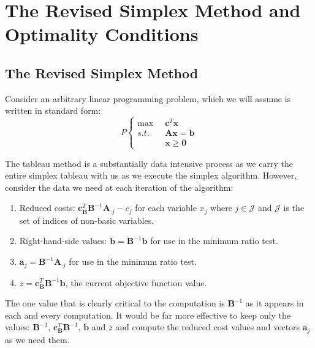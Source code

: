 \chapter{The Revised Simplex Method and Optimality Conditions}\label{chap:KKT}
\section{The Revised Simplex Method}
Consider an arbitrary linear programming problem, which we will assume is written in standard form:
\begin{equation}
P\left\{
\begin{aligned}
\max\;\; & \mathbf{c}^T\mathbf{x}\\
s.t.\;\; & \mathbf{A}\mathbf{x} = \mathbf{b}\\
& \mathbf{x} \geq \mathbf{0}
\end{aligned}\right.
\end{equation}

The tableau method is a substantially data intensive process as we carry the entire simplex tableau with us as we execute the simplex algorithm. However, consider the data we need at each iteration of the algorithm:
\begin{enumerate}
\item Reduced costs: $\mathbf{c}_\mathbf{B}^T\mathbf{B}^{-1}\mathbf{A}_{\cdot j} - c_j$ for each variable $x_j$ where $j \in \mathcal{J}$ and $\mathcal{J}$ is the set of indices of non-basic variables.

\item Right-hand-side values: $\overline{\mathbf{b}} = \mathbf{B}^{-1}\mathbf{b}$ for use in the minimum ratio test.

\item $\overline{\mathbf{a}}_j = \mathbf{B}^{-1}\mathbf{A}_{\cdot j}$ for use in the minimum ratio test.

\item $\overline{z} = \mathbf{c}_{\mathbf{B}}^T\mathbf{B}^{-1}\mathbf{b}$, the current objective function value. 
\end{enumerate}

The one value that is clearly critical to the computation is $\mathbf{B}^{-1}$ as it appears in each and every computation. It would be far more effective to keep only the values: $\mathbf{B}^{-1}$, $\mathbf{c}_{\mathbf{B}}^T\mathbf{B}^{-1}$, $\overline{\mathbf{b}}$ and $\overline{z}$ and compute the reduced cost values and vectors $\overline{\mathbf{a}}_j$ as we need them. 

